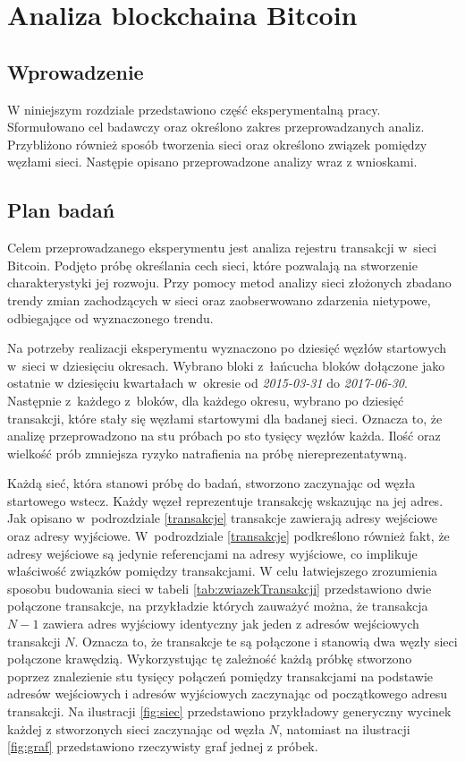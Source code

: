 \documentclass[12pt, twoside, final, openany]{mgr}
\begin{document}
\chapter{Analiza blockchaina Bitcoin}

\section{Wprowadzenie}

\indent W niniejszym rozdziale przedstawiono część eksperymentalną pracy. Sformułowano cel badawczy oraz określono zakres przeprowadzanych analiz. Przybliżono również sposób tworzenia sieci oraz określono związek pomiędzy węzłami sieci. Następie opisano przeprowadzone analizy wraz z wnioskami.

\section{Plan badań}

\indent Celem przeprowadzanego eksperymentu jest analiza rejestru transakcji w~sieci Bitcoin. Podjęto próbę określania cech sieci, które pozwalają na stworzenie charakterystyki jej rozwoju. Przy pomocy metod analizy sieci złożonych zbadano trendy zmian zachodzących w sieci oraz zaobserwowano zdarzenia nietypowe, odbiegające od wyznaczonego trendu. 

\indent Na potrzeby realizacji eksperymentu wyznaczono po dziesięć węzłów startowych w~sieci w dziesięciu okresach. Wybrano bloki z~łańcucha bloków dołączone jako ostatnie w dziesięciu kwartałach w~okresie od \textit{2015-03-31} do \textit{2017-06-30}. Następnie z~każdego z~bloków, dla każdego okresu, wybrano po dziesięć transakcji, które stały się węzłami startowymi dla badanej sieci. Oznacza to, że analizę przeprowadzono na stu próbach po sto tysięcy węzłów każda. Ilość oraz wielkość prób zmniejsza ryzyko natrafienia na próbę niereprezentatywną.

\indent Każdą sieć, która stanowi próbę do badań, stworzono zaczynając od węzła startowego wstecz. Każdy węzeł reprezentuje transakcję wskazując na jej adres. Jak opisano w~podrozdziale \ref{transakcje} transakcje zawierają adresy wejściowe oraz adresy wyjściowe. W~podrozdziale \ref{transakcje} podkreślono również fakt, że adresy wejściowe są jedynie referencjami na adresy wyjściowe, co implikuje właściwość związków pomiędzy transakcjami. W celu łatwiejszego zrozumienia sposobu budowania sieci w tabeli \ref{tab:zwiazekTransakcji} przedstawiono dwie połączone transakcje, na przykładzie których zauważyć można, że transakcja $N-1$ zawiera adres wyjściowy identyczny jak jeden z adresów wejściowych transakcji $N$. Oznacza to, że transakcje te są połączone i stanowią dwa węzły sieci połączone krawędzią. Wykorzystując tę zależność każdą próbkę stworzono poprzez znalezienie stu tysięcy połączeń pomiędzy transakcjami na podstawie adresów wejściowych i adresów wyjściowych zaczynając od początkowego adresu transakcji. Na ilustracji \ref{fig:siec} przedstawiono przykładowy generyczny wycinek każdej z stworzonych sieci zaczynając od węzła $N$, natomiast na ilustracji \ref{fig:graf} przedstawiono rzeczywisty graf jednej z próbek.
\end{document}
